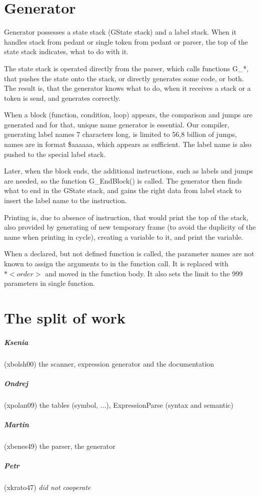 \documentclass[10pt,a4paper,titlepage]{article}
\begin{document}
\section{Generator}
\begin{justify}
Generator possesses a state stack (GState stack) and a label stack.
When it handles stack from pedant or single token from pedant or parser,
the top of the state stack indicates, what to do with it.

The state stack is operated directly from the parser, which calls functions
G\_*, that pushes the state onto the stack, or directly generates some code,
or both. The result is, that the generator knows what to do, when it receives
a stack or a token is send, and generates correctly.

When a block (function, condition, loop) appears, the comparison and jumps
are generated and for that, unique name generator is essential. Our compiler,
generating label names 7 characters long, is limited to 56,8 billion of jumps,
names are in format \$aaaaaa, which appears as sufficient. The label name
is also pushed to the special label stack.

Later, when the block ends, the additional instructions, such as labels
and jumps are needed, so the function G\_EndBlock() is called. The generator
then finds what to end in the GState stack, and gains the right data from
label stack to insert the label name to the instruction.

Printing is, due to absence of instruction, that would print the top of the
stack, also provided by generating of new temporary frame (to avoid the
duplicity of the name when printing in cycle), creating a variable to it,
and print the variable.

When a declared, but not defined function is called, the parameter names
are not known to assign the arguments to in the function call. It is
replaced with $*<order>$ and moved in the function body. It also sets the 
limit to the 999 parameters in single function.
\end{justify}
\newpage

\section{The split of work}
\subparagraph{Ksenia} (xbolsh00) the scanner, expression generator and the documentation
\subparagraph{Ondrej} (xpolan09) the tables (symbol, ...), ExpressionParse (syntax and semantic)
\subparagraph{Martin} (xbenes49) the parser, the generator
\subparagraph{Petr} (xkrato47) {\it did not cooperate}
\end{document}
